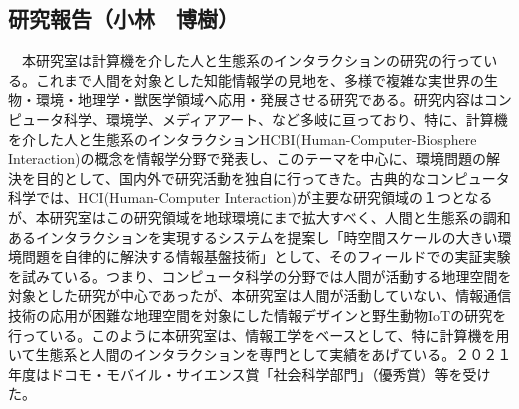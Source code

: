 \subsection{研究報告（小林　博樹）}
　本研究室は計算機を介した人と生態系のインタラクションの研究の行っている。これまで人間を対象とした知能情報学の見地を、多様で複雑な実世界の生物・環境・地理学・獣医学領域へ応用・発展させる研究である。研究内容はコンピュータ科学、環境学、メディアアート、など多岐に亘っており、特に、計算機を介した人と生態系のインタラクションHCBI(Human-Computer-Biosphere Interaction)の概念を情報学分野で発表し、このテーマを中心に、環境問題の解決を目的として、国内外で研究活動を独自に行ってきた。古典的なコンピュータ科学では、HCI(Human-Computer Interaction)が主要な研究領域の１つとなるが、本研究室はこの研究領域を地球環境にまで拡大すべく、人間と生態系の調和あるインタラクションを実現するシステムを提案し「時空間スケールの大きい環境問題を自律的に解決する情報基盤技術」として、そのフィールドでの実証実験を試みている。つまり、コンピュータ科学の分野では人間が活動する地理空間を対象とした研究が中心であったが、本研究室は人間が活動していない、情報通信技術の応用が困難な地理空間を対象にした情報デザインと野生動物IoTの研究を行っている。このように本研究室は、情報工学をベースとして、特に計算機を用いて生態系と人間のインタラクションを専門として実績をあげている。２０２１年度はドコモ・モバイル・サイエンス賞「社会科学部門」（優秀賞）等を受けた。
